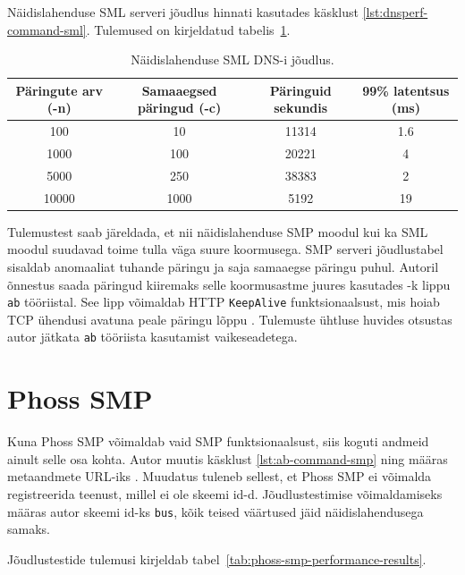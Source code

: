 Näidislahenduse SML serveri jõudlus hinnati kasutades käsklust \ref{lst:dnsperf-command-sml}. 
Tulemused on kirjeldatud tabelis~\ref{tab:poc-sml-performance-results}.

\begin{table}[H]
    \caption{Näidislahenduse SML DNS-i jõudlus.}
    \label{tab:poc-sml-performance-results}
    \begin{tabular}{|c|c|c|c|}
        \hline
        Päringute arv (-n) & Samaaegsed päringud (-c) & Päringuid sekundis & 99\% latentsus (ms) \\
        \hline
        100 & 10 & 11314 & 1.6 \\
        \hline
        1000 & 100 & 20221 & 4 \\
        \hline
        5000 & 250 & 38383 & 2 \\
        \hline
        10000 & 1000 & 5192 & 19 \\
        \hline
    \end{tabular}
\end{table}

Tulemustest saab järeldada, et nii näidislahenduse SMP moodul kui ka SML
moodul suudavad toime tulla väga suure koormusega. SMP serveri jõudlustabel sisaldab anomaaliat tuhande
päringu ja saja samaaegse päringu puhul. Autoril õnnestus saada päringud 
kiiremaks selle koormusastme juures kasutades -k lippu \texttt{ab} tööriistal.
See lipp võimaldab HTTP \texttt{KeepAlive} funktsionaalsust, mis hoiab TCP 
ühendusi avatuna peale päringu lõppu \cite{apache_ab_tool}. 
Tulemuste ühtluse huvides otsustas autor jätkata \texttt{ab} tööriista kasutamist vaikeseadetega. 


\section{Phoss SMP}
Kuna Phoss SMP võimaldab vaid SMP funktsionaalsust, siis koguti andmeid ainult selle osa kohta.
Autor muutis käsklust \ref{lst:ab-command-smp} ning määras metaandmete URL-iks
\texttt{}.
Muudatus tuleneb sellest, et Phoss SMP ei võimalda registreerida teenust, millel ei ole skeemi id-d.
Jõudlustestimise võimaldamiseks määras autor skeemi id-ks \texttt{bus}, 
kõik teised väärtused jäid näidislahendusega samaks.

Jõudlustestide tulemusi kirjeldab tabel~\ref{tab:phoss-smp-performance-results}.

